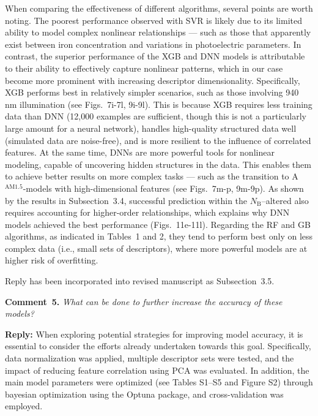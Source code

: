 \documentclass[a4paper,fleqn]{cas-sc}
\begin{document}
When comparing the effectiveness of different algorithms, several points are worth noting.
The poorest performance observed with SVR is likely due to its limited ability
to model complex nonlinear relationships ---
such as those that apparently exist between iron concentration and variations in photoelectric parameters.
In contrast, the superior performance of the XGB and DNN models is attributable to
their ability to effectively capture nonlinear patterns, which in our case become more prominent with increasing descriptor dimensionality.
Specifically, XGB performs best in relatively simpler scenarios, such as those involving 940 nm illumination
(see Figs.~7i-7l, 9i-9l).
This is because XGB requires less training data than DNN
(12,000 examples are sufficient, though this is not a particularly large amount for a neural network),
handles high-quality structured data well (simulated data are noise-free),
and is more resilient to the influence of correlated features.
At the same time, DNNs are more powerful tools for nonlinear modeling,
capable of uncovering hidden structures in the data.
This enables them to achieve better results on more complex tasks ---
such as the transition to A$^\mathrm{AM1.5}$-models with high-dimensional features
(see Figs.~7m-p, 9m-9p).
As shown by the results in Subsection~3.4, successful prediction within the
$N_\mathrm{B}$--altered also requires accounting for higher-order relationships,
which explains why DNN models achieved the best performance (Figs.~11e-11l).
Regarding the RF and GB algorithms, as indicated in Tables~1 and 2,
they tend to perform best only on less complex data
(i.e., small sets of descriptors), where more powerful models are at higher risk of overfitting.

Reply has been incorporated into revised manuscript as Subsection~3.5.

\vspace{1cm}
\noindent
\textcolor[rgb]{0.00,0.50,1.00}{\textbf{Comment~5.}}
\emph{What can be done to further increase the accuracy of these models?}

\noindent
\textcolor[rgb]{0.51,0.00,0.00}{\textbf{Reply:}}
When exploring potential strategies for improving model accuracy,
it is essential to consider the efforts already undertaken towards this goal.
Specifically, data normalization was applied,
multiple descriptor sets were tested, and the impact of reducing feature correlation using PCA was evaluated.
In addition, the main model parameters were optimized (see Tables S1–S5 and Figure S2)
through bayesian optimization using the Optuna package, and cross-validation was employed.
\end{document}
